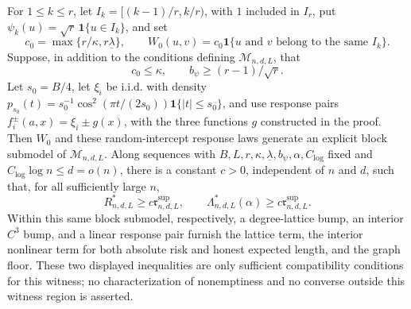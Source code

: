 For \(1\leq k\leq r\), let \(I_k=[(k-1)/r,k/r)\), with \(1\) included in \(I_r\), put \(\psi_k(u)=\sqrt r\,\mathbf 1\{u\in I_k\}\), and set
\[
 c_0=\max\{r/\kappa,r\underline\lambda\},
 \qquad
 W_0(u,v)=c_0\mathbf 1\{u\text{ and }v\text{ belong to the same }I_k\}.
\]
Suppose, in addition to the conditions defining \(\mathcal M_{n,d,L}\), that
\[
 c_0\leq\kappa,
 \qquad
 b_\psi\geq (r-1)/\sqrt r.
\]
Let \(s_0=B/4\), let \(\xi_i\) be i.i.d. with density \(p_{s_0}(t)=s_0^{-1}\cos^2(\pi t/(2s_0))\mathbf 1\{|t|\leq s_0\}\), and use response pairs \(f_i^\pm(a,x)=\xi_i\pm g(x)\), with the three functions \(g\) constructed in the proof.  Then \(W_0\) and these random-intercept response laws generate an explicit block submodel of \(\mathcal M_{n,d,L}\).  Along sequences with \(B,L,r,\kappa,\underline\lambda,b_\psi,\alpha,C_{\log}\) fixed and \(C_{\log}\log n\leq d=o(n)\), there is a constant \(c>0\), independent of \(n\) and \(d\), such that, for all sufficiently large \(n\),
\[
 R^*_{n,d,L}\geq c\mathfrak r^{\mathrm{sup}}_{n,d,L},
 \qquad
 \Lambda^*_{n,d,L}(\alpha)\geq c\mathfrak r^{\mathrm{sup}}_{n,d,L}.
\]
Within this same block submodel, respectively, a degree-lattice bump, an interior \(C^3\) bump, and a linear response pair furnish the lattice term, the interior nonlinear term for both absolute risk and honest expected length, and the graph floor.  These two displayed inequalities are only sufficient compatibility conditions for this witness; no characterization of nonemptiness and no converse outside this witness region is asserted.